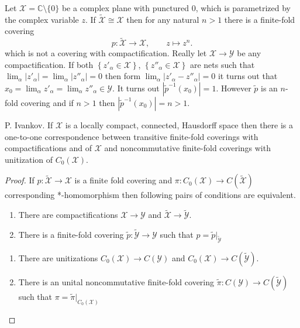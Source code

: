 \documentclass{beamer}
\theoremstyle{plain}
\newcommand{\C}{\mathbb{C}}
\newcommand{\al}{\alpha}
\begin{document}
\begin{frame}
\begin{example}
	
	Let $\mathcal X  = \C \setminus \{0\}$ be a complex plane with punctured 0, which is parametrized by the complex variable $z$. 
	If $\widetilde{   \mathcal X } \cong \mathcal X$ then for any natural $n>1$ there is a finite-fold covering 
	\begin{equation*}
	p: \widetilde{   \mathcal X } \to \mathcal X,
	\qquad	z \mapsto z^n.
	\end{equation*}
	which is not a covering with compactification. Really let  $\mathcal X \to\mathcal Y$ be any compactification. If both $\left\{z'_\al \in \mathcal X\right\}$, 	$\left\{z''_\al \in \mathcal X\right\}$ are  nets such that $\lim_{\al}\left|z'_\al\right|=\lim_\al\left|z''_\al\right| = 0$ then form $\lim_{\al}\left|z'_\al-z''_\al\right|= 0$ it turns out that
	$
	x_0 = \lim_{\al} z'_\al = \lim_{\al} z''_\al \in \mathcal Y
	$. 	It turns out $\left|\widetilde{p}^{-1}\left(x_0 \right) \right|=1$. However $\widetilde{p}$ is an $n$-fold covering and if $n >1$ then  $\left|\widetilde{p}^{-1}\left(x_0 \right) \right|=n>1$.
\end{example}
\end{frame}
\begin{frame}
\begin{lemma}
	\alert{P. Ivankov}. If $\mathcal X$ is a locally compact, connected, Hausdorff space then there is a one-to-one correspondence between transitive finite-fold coverings with compactifications and of $\mathcal X$ and noncommutative finite-fold coverings with unitization of $C_0\left(\mathcal X\right)$.
\end{lemma}
\begin{proof}
	If $p: \widetilde{   \mathcal X }\to  \mathcal X$ is a finite fold covering and $\pi: C_0\left({   \mathcal X }\right)  \to C\left( \widetilde{   \mathcal X }\right)$ corresponding *-homomorphism then
following pairs of conditions are equivalent.
\begin{enumerate}
	\item There are compactifications ${   \mathcal X } \to {   \mathcal Y }$ and $\widetilde{   \mathcal X } \to \widetilde{   \mathcal Y }$.
	\item There is a finite-fold  covering $\widetilde{p}:\widetilde{   \mathcal Y }\to {   \mathcal Y }$ such that $p= \widetilde{p}|_{\widetilde{   \mathcal Y }}$
\end{enumerate}
\begin{enumerate}
	\item There are unitizations $C_0\left( {   \mathcal X } \right) \to C\left(  {   \mathcal Y }\right) $ and $C_0\left({   \mathcal X }\right)  \to C\left( \widetilde{   \mathcal Y }\right) $.
	\item There is an unital noncommutative finite-fold  covering $\widetilde{\pi}:C\left({   \mathcal Y } \right)\to C\left(  \widetilde{   \mathcal Y }\right) $ such that $\pi= \widetilde{\pi}|_{C_0\left( {\mathcal X}\right)  }$
\end{enumerate}

\end{proof}

\end{frame}
\end{document}
